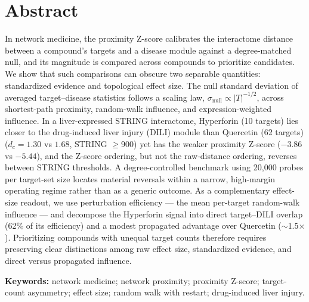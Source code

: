 \section*{Abstract}

In network medicine, the proximity Z-score calibrates the interactome distance between a compound's targets and a disease module against a degree-matched null, and its magnitude is compared across compounds to prioritize candidates. We show that such comparisons can obscure two separable quantities: standardized evidence and topological effect size. The null standard deviation of averaged target--disease statistics follows a scaling law, $\sigma_{\text{null}} \propto |T|^{-1/2}$, across shortest-path proximity, random-walk influence, and expression-weighted influence. In a liver-expressed STRING interactome, Hyperforin (10 targets) lies closer to the drug-induced liver injury (DILI) module than Quercetin (62 targets) ($d_c = 1.30$ vs $1.68$, STRING $\geq$900) yet has the weaker proximity Z-score ($-3.86$ vs $-5.44$), and the Z-score ordering, but not the raw-distance ordering, reverses between STRING thresholds. A degree-controlled benchmark using 20{,}000 probes per target-set size locates material reversals within a narrow, high-margin operating regime rather than as a generic outcome. As a complementary effect-size readout, we use perturbation efficiency --- the mean per-target random-walk influence --- and decompose the Hyperforin signal into direct target--DILI overlap (62\% of its efficiency) and a modest propagated advantage over Quercetin ($\sim$1.5$\times$). Prioritizing compounds with unequal target counts therefore requires preserving clear distinctions among raw effect size, standardized evidence, and direct versus propagated influence.

\vspace{0.5em}
\noindent\textbf{Keywords:} network medicine; network proximity; proximity Z-score; target-count asymmetry; effect size; random walk with restart; drug-induced liver injury.
